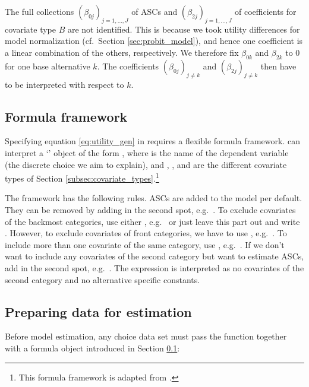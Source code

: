 \documentclass[article,shortnames]{jss}
\newcommand{\class}[1]{`\code{#1}'}
\newcommand{\fct}[1]{\code{#1()}}
\begin{document}
The full collections $(\beta_{0j})_{j=1,\dots,J}$ of ASCs and $(\beta_{2j})_{j=1,\dots,J}$ of coefficients for covariate type $B$ are not identified. This is because we took utility differences for model normalization (cf.\ Section \ref{sec:probit_model}), and hence one coefficient is a linear combination of the others, respectively. We therefore fix $\beta_{0k}$ and $\beta_{2k}$ to 0 for one base alternative $k$. The coefficients $(\beta_{0j})_{j\neq k}$ and $(\beta_{2j})_{j\neq k}$ then have to be interpreted with respect to $k$.

\subsection{Formula framework} \label{subsec:formula}

Specifying equation \eqref{eq:utility_gen} in  requires a flexible formula framework.  can interpret a \class{formula} object of the form , where  is the name of the dependent variable (the discrete choice we aim to explain), and , , and  are the different covariate types of Section \ref{subsec:covariate_types}.\footnote{This formula framework is adapted from .}

The framework has the following rules. ASCs are added to the model per default. They can be removed by adding  in the second spot, e.g.\ . To exclude covariates of the backmost categories, use either , e.g.\  or just leave this part out and write . However, to exclude covariates of front categories, we have to use , e.g.\ . To include more than one covariate of the same category, use \code{+}, e.g.\ . If we don't want to include any covariates of the second category but want to estimate ASCs, add  in the second spot, e.g.\ . The expression  is interpreted as no covariates of the second category and no alternative specific constants.

\subsection{Preparing data for estimation} \label{subsec:prepare_data}

Before model estimation, any choice data set  must pass the \fct{prepare\_data} function together with a formula object  introduced in Section \ref{subsec:formula}:
\end{document}
